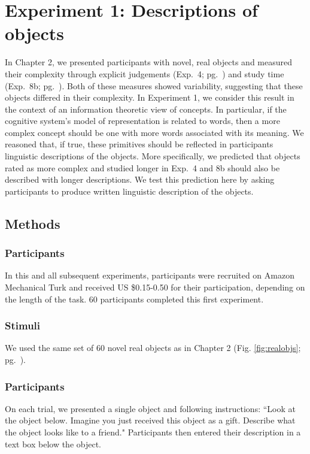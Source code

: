 \section{Experiment 1: Descriptions of objects}
In Chapter 2, we presented participants with novel, real objects and measured their complexity through explicit judgements (Exp.\ 4; pg.\ \pageref{ch2-4}) and study time (Exp.\ 8b; pg.\ \pageref{ch2-8b}). Both of these measures showed variability, suggesting that these objects differed in their complexity.  In Experiment 1, we consider this result in the context of an information theoretic view of concepts. In particular, if the cognitive system's model of representation is related to words, then a more complex concept should be one with more words associated with its meaning. We reasoned that, if true, these primitives should be reflected in participants linguistic descriptions of the objects. More specifically, we predicted that objects rated as more complex and studied longer in Exp.\ 4 and 8b should also be described with longer descriptions. We test this prediction here by asking participants to produce written linguistic description of the objects.

\subsection{Methods}
\subsubsection{Participants} 
In this and all subsequent experiments, participants were recruited on Amazon Mechanical Turk and received US \$0.15-0.50 for their participation, depending on the length of the task. 60 participants completed this first experiment.
\subsubsection{Stimuli}  
We used the same set of 60 novel real objects as in Chapter 2 (Fig. \ref{fig:realobjs}; pg.\ \pageref{fig:realobjs}).
\subsubsection{Participants} 
On each trial, we presented a single object and following instructions:  ``Look at the object below. Imagine you just received this object as a gift. Describe what the object looks like to a friend." Participants then entered their description in a text box below the object.

